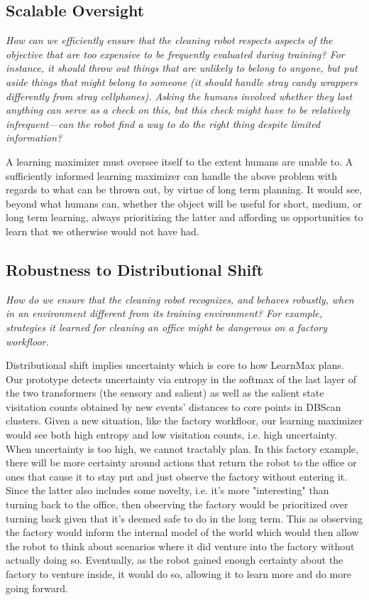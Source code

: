 \documentclass{article}
\begin{document}
\subsection{Scalable Oversight}
\textit{How can we efficiently ensure that the cleaning robot respects aspects of
the objective that are too expensive to be frequently evaluated during training? For instance, it
should throw out things that are unlikely to belong to anyone, but put aside things that might
belong to someone (it should handle stray candy wrappers differently from stray cellphones).
Asking the humans involved whether they lost anything can serve as a check on this, but this
check might have to be relatively infrequent—can the robot find a way to do the right thing
despite limited information?}

\hspace{1pt}

A learning maximizer must oversee itself to the extent humans are unable to. A sufficiently informed learning
maximizer can handle the above problem with regards to what can be thrown out, by
virtue of long term planning. It would see, beyond what humans can, whether the object will
be useful for short, medium, or long term learning, always prioritizing the latter and affording us opportunities to learn that we otherwise would not have had.


\subsection{Robustness to Distributional Shift}
\textit{How do we ensure that the cleaning robot recognizes,
and behaves robustly, when in an environment different from its training environment? For example, strategies it learned for cleaning an office might be dangerous on a factory workfloor.}

\hspace{1pt}

Distributional shift implies uncertainty which is core to how LearnMax plans. Our prototype detects uncertainty via entropy in the softmax of the last layer of the two transformers (the sensory and salient) as well as the salient state visitation counts obtained by new events' distances to core points in DBScan clusters. Given a new situation, like the factory workfloor, our learning maximizer would see both high entropy and low visitation counts, i.e. high uncertainty. When uncertainty is too high, we cannot tractably plan. In this factory example, there will be more certainty around actions that return the robot to the office or ones that cause it to stay put and just observe the factory without entering it. Since the latter also includes some novelty, i.e. it's more "interesting" than turning back to the office, then observing the factory would be prioritized over turning back given that it's deemed safe to do in the long term. This as observing the factory would inform the internal model of the world which would then allow the robot to think about scenarios where it did venture into the factory without actually doing so. \cite{jang2023reflection} Eventually, as the robot gained enough certainty about the factory to venture inside, it would do so, allowing it to learn more and do more going forward.
\end{document}
